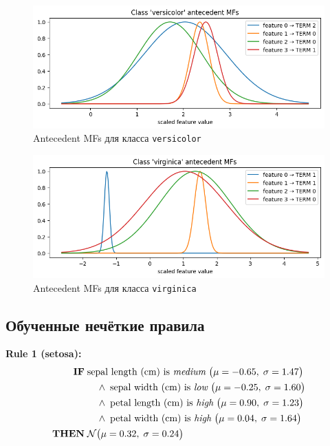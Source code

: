\begin{figure}[H]
  \centering
  \includegraphics[width=0.9\linewidth]{images/mf_in_versicolor.png}
  \caption{Antecedent MFs для класса \texttt{versicolor}}
  \label{fig:mf_in_versicolor}
\end{figure}

\begin{figure}[H]
  \centering
  \includegraphics[width=0.9\linewidth]{images/mf_in_virginica.png}
  \caption{Antecedent MFs для класса \texttt{virginica}}
  \label{fig:mf_in_virginica}
\end{figure}

\subsection*{Обученные нечёткие правила}

\noindent\textbf{Rule 1 (setosa):}  
\begin{align*}
  \textbf{IF}\;&\text{sepal length (cm) is \emph{medium}}\;\bigl(\mu=-0.65,\;\sigma=1.47\bigr)\\
                &\quad\land\;\text{sepal width  (cm) is \emph{low}}   \;\bigl(\mu=-0.25,\;\sigma=1.60\bigr)\\
                &\quad\land\;\text{petal length (cm) is \emph{high}}  \;\bigl(\mu=0.90,\;\sigma=1.23\bigr)\\
                &\quad\land\;\text{petal width  (cm) is \emph{high}}  \;\bigl(\mu=0.04,\;\sigma=1.64\bigr)\\
  \textbf{THEN}\;&\mathcal{N}\bigl(\mu=0.32,\;\sigma=0.24\bigr)
\end{align*}

